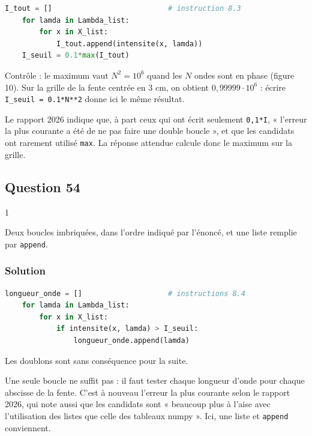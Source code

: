 \documentclass[11pt,a4paper]{article}
\begin{document}
\begin{lstlisting}[language=Python]
    I_tout = []                           # instruction 8.3
    for lamda in Lambda_list:
        for x in X_list:
            I_tout.append(intensite(x, lamda))
    I_seuil = 0.1*max(I_tout)
\end{lstlisting}

Contrôle : le maximum vaut \(N^2=10^6\) quand les \(N\) ondes sont en phase (figure 10). Sur la grille de la fente centrée en 3 cm, on obtient \(0{,}99999\cdot10^6\) : écrire \texttt{I\_seuil\ =\allowbreak{}\ 0.1*N**2} donne ici le même résultat.

\begin{jury}

Le rapport 2026 indique que, à part ceux qui ont écrit seulement \texttt{0,1*I}, « l'erreur la plus courante a été de ne pas faire une double boucle », et que les candidats ont rarement utilisé \texttt{max}. La réponse attendue calcule donc le maximum sur la grille.

\end{jury}

\hypertarget{question-54}{%
\subsection{Question 54}\label{question-54}}

\begin{indication}{1}

Deux boucles imbriquées, dans l'ordre indiqué par l'énoncé, et une liste remplie par \texttt{append}.

\end{indication}

\hypertarget{solution-53}{%
\subsubsection{Solution}\label{solution-53}}

\begin{lstlisting}[language=Python]
    longueur_onde = []                    # instructions 8.4
    for lamda in Lambda_list:
        for x in X_list:
            if intensite(x, lamda) > I_seuil:
                longueur_onde.append(lamda)
\end{lstlisting}

Les doublons sont sans conséquence pour la suite.

\begin{piege}

Une seule boucle ne suffit pas : il faut tester chaque longueur d'onde pour chaque abscisse de la fente. C'est à nouveau l'erreur la plus courante selon le rapport 2026, qui note aussi que les candidats sont « beaucoup plus à l'aise avec l'utilisation des listes que celle des tableaux numpy ». Ici, une liste et \texttt{append} conviennent.

\end{piege}
\end{document}
